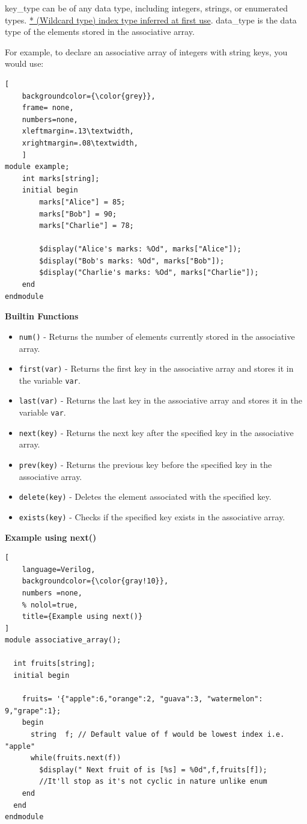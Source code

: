 \documentclass[12pt, a4paper]{article}
\begin{document}
key\_type can be of any data type, including integers, strings, or enumerated types. \ul{* (Wildcard type) index type inferred at first use}.
data\_type is the data type of the elements stored in the associative array.

\vspace{0.5em}

For example, to declare an associative array of integers with string keys, you would use:
\begin{lstlisting}[
    backgroundcolor={\color{grey}},
    frame= none,
    numbers=none,
    xleftmargin=.13\textwidth,
    xrightmargin=.08\textwidth, 
    ]
module example;
    int marks[string];
    initial begin
        marks["Alice"] = 85;
        marks["Bob"] = 90;
        marks["Charlie"] = 78;
        
        $display("Alice's marks: %Od", marks["Alice"]);
        $display("Bob's marks: %Od", marks["Bob"]);
        $display("Charlie's marks: %Od", marks["Charlie"]);
    end
endmodule
\end{lstlisting}

\textbf{Builtin Functions}
\vspace{0.2em}
\begin{itemize}[nosep]
    \item \texttt{num()} - Returns the number of elements currently stored in the associative array.
    \item \texttt{first(var)} - Returns the first key in the associative array and stores it in the variable \texttt{var}.
    \item \texttt{last(var)} - Returns the last key in the associative array and stores it in the variable \texttt{var}.
    \item \texttt{next(key)} - Returns the next key after the specified key in the associative array.
    \item \texttt{prev(key)} - Returns the previous key before the specified key in the associative array.
    \item \texttt{delete(key)} - Deletes the element associated with the specified key.
    \item \texttt{exists(key)} - Checks if the specified key exists in the associative array.
\end{itemize}

\textbf{Example using next()}

\begin{lstlisting}[
    language=Verilog,
    backgroundcolor={\color{gray!10}},
    numbers =none,
    % nolol=true,
    title={Example using next()}
]
module associative_array();

  int fruits[string];  
  initial begin
    
    fruits= '{"apple":6,"orange":2, "guava":3, "watermelon": 9,"grape":1};
    begin
      string  f; // Default value of f would be lowest index i.e. "apple"
      while(fruits.next(f))
        $display(" Next fruit of is [%s] = %0d",f,fruits[f]);
        //It'll stop as it's not cyclic in nature unlike enum
    end
  end
endmodule
\end{lstlisting}
\end{document}
